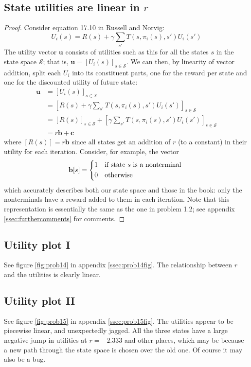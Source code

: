 \documentclass[letterpaper, 10pt]{article}
\begin{document}
\begin{multicols*}{2}
\subsection{State utilities are linear in $r$}
\begin{proof}
Consider equation 17.10 in Russell and Norvig:
\[ U_i(s) = R(s) + \gamma \sum_{s'} T(s, \pi_i(s), s') U_i(s') \]
The utility vector $\mathbf{u}$ consists of utilities such as this for all the states $s$ in the state space $\mathcal{S}$; that is, $\mathbf{u} = [U_i(s)]_{s \in \mathcal{S}}$.
We can then, by linearity of vector addition, split each $U_i$ into its constituent parts, one for the reward per state and one for the discounted utility of future state:
\begin{align*}
\mathbf{u} &= [U_i(s)]_{s \in \mathcal{S}} \\
&= \left[ R(s) + \gamma \sum_{s'} T(s, \pi_i(s), s') U_i(s') \right]_{s \in \mathcal{S}} \\
&= [R(s)]_{s \in \mathcal{S}} + \left[ \gamma \sum_{s'} T(s, \pi_i(s), s') U_i(s') \right]_{s \in \mathcal{S}} \\
&= r\mathbf{b} + \mathbf{c}
\end{align*}
where $[R(s)] = r\mathbf{b}$ since all states get an addition of $r$ (to a constant) in their utility for each iteration.
Consider, for example, the vector
\[
\mathbf{b}[s] = \begin{dcases*}
1 & if state $s$ is a nonterminal \\
0 & otherwise
\end{dcases*}
\]
which accurately describes both our state space and those in the book: only the nonterminals have a reward added to them in each iteration.
Note that this representation is essentially the same as the one in problem 1.2; see appendix \ref{ssec:furthercomments} for comments.
\end{proof}

\subsection{Utility plot I}
See figure \ref{fig:prob14} in appendix \ref{ssec:prob14fig}. The relationship between $r$ and the utilities is clearly linear.

\subsection{Utility plot II}
See figure \ref{fig:prob15} in appendix \ref{ssec:prob15fig}. 
The utilities appear to be piecewise linear, and unexpectedly jagged. 
All the three states have a large negative jump in utilities at $r = -2.333$ and other places, which may be because a new path through the state space is chosen over the old one.
Of course it may also be a bug.


\end{multicols*}
\end{document}

